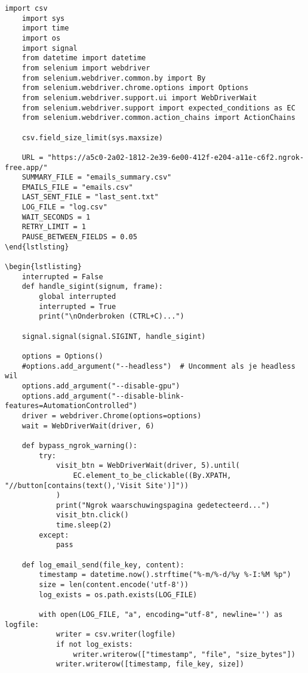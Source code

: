 \begin{lstlisting}[style=custompython,caption={Selenium WebDriver script voor automatisering van gegevensverwerking},label={lst:send-request}]
    import csv
    import sys
    import time
    import os
    import signal
    from datetime import datetime
    from selenium import webdriver
    from selenium.webdriver.common.by import By
    from selenium.webdriver.chrome.options import Options
    from selenium.webdriver.support.ui import WebDriverWait
    from selenium.webdriver.support import expected_conditions as EC
    from selenium.webdriver.common.action_chains import ActionChains

    csv.field_size_limit(sys.maxsize)

    URL = "https://a5c0-2a02-1812-2e39-6e00-412f-e204-a11e-c6f2.ngrok-free.app/"
    SUMMARY_FILE = "emails_summary.csv"
    EMAILS_FILE = "emails.csv"
    LAST_SENT_FILE = "last_sent.txt"
    LOG_FILE = "log.csv"
    WAIT_SECONDS = 1
    RETRY_LIMIT = 1
    PAUSE_BETWEEN_FIELDS = 0.05
\end{lstlsting}

\begin{lstlisting}
    interrupted = False
    def handle_sigint(signum, frame):
        global interrupted
        interrupted = True
        print("\nOnderbroken (CTRL+C)...")

    signal.signal(signal.SIGINT, handle_sigint)

    options = Options()
    #options.add_argument("--headless")  # Uncomment als je headless wil
    options.add_argument("--disable-gpu")
    options.add_argument("--disable-blink-features=AutomationControlled")
    driver = webdriver.Chrome(options=options)
    wait = WebDriverWait(driver, 6)

    def bypass_ngrok_warning():
        try:
            visit_btn = WebDriverWait(driver, 5).until(
                EC.element_to_be_clickable((By.XPATH, "//button[contains(text(),'Visit Site')]"))
            )
            print("Ngrok waarschuwingspagina gedetecteerd...")
            visit_btn.click()
            time.sleep(2)
        except:
            pass

    def log_email_send(file_key, content):
        timestamp = datetime.now().strftime("%-m/%-d/%y %-I:%M %p")
        size = len(content.encode('utf-8'))
        log_exists = os.path.exists(LOG_FILE)

        with open(LOG_FILE, "a", encoding="utf-8", newline='') as logfile:
            writer = csv.writer(logfile)
            if not log_exists:
                writer.writerow(["timestamp", "file", "size_bytes"])
            writer.writerow([timestamp, file_key, size])


\end{lstlisting}
